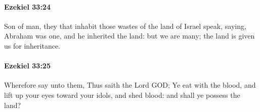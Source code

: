 		\paragraph{Ezekiel 33:24} %
			\label{EZEKIEL-33-24}

			Son of man, they that inhabit those wastes of the land of Israel speak, saying, Abraham was one, and he inherited the land: but we are many; the land is given us for inheritance.


		\paragraph{Ezekiel 33:25} %
			\label{EZEKIEL-33-25}

			Wherefore say unto them, Thus saith the Lord GOD; Ye eat with the blood, and lift up your eyes toward your idols, and shed blood: and shall ye possess the land?


